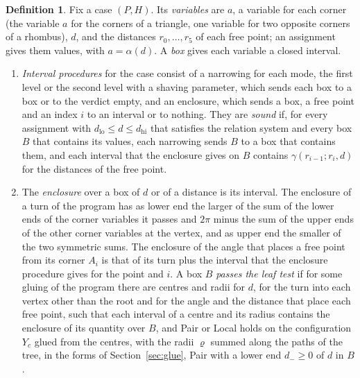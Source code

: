 \documentclass[12pt]{amsart}
\theoremstyle{definition}
\newtheorem{definition}[theorem]{Definition}
\theoremstyle{plain}
\theoremstyle{definition}
\newcommand{\dlo}{d_{\mathrm{lo}}}
\newcommand{\dhi}{d_{\mathrm{hi}}}
\newcommand{\leanmap}[1]{\ignorespaces}
\newcommand{\mapnote}[1]{\ignorespaces}
\begin{document}
\begin{definition}\label{def:procs}\leanmap{Tammes15.PaperSteps.Procs, Tammes15.PaperSteps.Procs.Sound, Tammes15.PaperSteps.Sol, Tammes15.PaperSteps.Mode, Tammes15.PaperSteps.PVar, Tammes15.PaperSteps.Search.Box, Tammes15.PaperSteps.Search.Tree, Tammes15.PaperSteps.Search.Tree.OK, Tammes15.PaperSteps.LeafKill, Tammes15.PaperSteps.Encl.Covers, Tammes15.PaperSteps.PairC, Tammes15.PaperSteps.TieC, Tammes15.PaperSteps.RootOK}\mapnote{in the formalization the variable of a corner is attached to its dart, and the definitions are stated for all cases at once; the enclosure depends on the graph and $k$, not on the choice of hexagons}
Fix a case $(P,H)$. Its \emph{variables} are $a$, a variable for each corner (the variable $a$ for the corners of a triangle, one variable for two opposite corners of a rhombus), $d$, and the distances $r_0,\dots,r_5$ of each free point; an assignment gives them values, with $a=\alpha(d)$. A \emph{box} gives each variable a closed interval.
\begin{enumerate}
\item \emph{Interval procedures} for the case consist of a narrowing for each mode, the first level or the second level with a shaving parameter, which sends each box to a box or to the verdict empty, and an enclosure, which sends a box, a free point and an index $i$ to an interval or to nothing. They are \emph{sound} if, for every assignment with $\dlo\le d\le\dhi$ that satisfies the relation system and every box $B$ that contains its values, each narrowing sends $B$ to a box that contains them, and each interval that the enclosure gives on $B$ contains $\gamma(r_{i-1};r_i,d)$ for the distances of the free point.
\item The \emph{enclosure} over a box of $d$ or of a distance is its interval. The enclosure of a turn of the program has as lower end the larger of the sum of the lower ends of the corner variables it passes and $2\pi$ minus the sum of the upper ends of the other corner variables at the vertex, and as upper end the smaller of the two symmetric sums. The enclosure of the angle that places a free point from its corner $A_i$ is that of its turn plus the interval that the enclosure procedure gives for the point and $i$. A box $B$ \emph{passes the leaf test} if for some gluing of the program there are centres and radii for $d$, for the turn into each vertex other than the root and for the angle and the distance that place each free point, such that each interval of a centre and its radius contains the enclosure of its quantity over $B$, and Pair or Local holds on the configuration $Y_c$ glued from the centres, with the radii $\varrho$ summed along the paths of the tree, in the forms of Section~\ref{sec:glue}, Pair with a lower end $d_-\ge0$ of $d$ in $B$.

\end{enumerate}
\end{definition}
\end{document}

